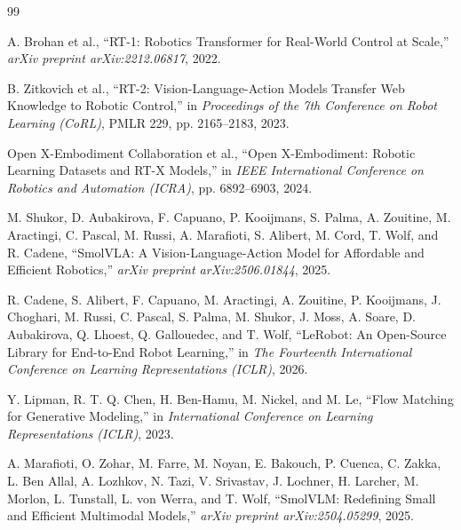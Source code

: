 \documentclass[12pt,a4paper]{report}
\begin{document}
\clearpage
\begin{thebibliography}{99}

A. Brohan et al.,
\newblock ``RT-1: Robotics Transformer for Real-World Control at Scale,''
\newblock \emph{arXiv preprint arXiv:2212.06817}, 2022.

B. Zitkovich et al.,
\newblock ``RT-2: Vision-Language-Action Models Transfer Web Knowledge to Robotic Control,''
\newblock in \emph{Proceedings of the 7th Conference on Robot Learning (CoRL)},
PMLR 229, pp. 2165--2183, 2023.

Open X-Embodiment Collaboration et al.,
\newblock ``Open X-Embodiment: Robotic Learning Datasets and RT-X Models,''
\newblock in \emph{IEEE International Conference on Robotics and Automation (ICRA)}, pp. 6892--6903, 2024.

M. Shukor, D. Aubakirova, F. Capuano, P. Kooijmans, S. Palma, A. Zouitine,
M. Aractingi, C. Pascal, M. Russi, A. Marafioti, S. Alibert, M. Cord,
T. Wolf, and R. Cadene,
\newblock ``SmolVLA: A Vision-Language-Action Model for Affordable and Efficient Robotics,''
\newblock \emph{arXiv preprint arXiv:2506.01844}, 2025.

R. Cadene, S. Alibert, F. Capuano, M. Aractingi, A. Zouitine, P. Kooijmans,
J. Choghari, M. Russi, C. Pascal, S. Palma, M. Shukor, J. Moss, A. Soare,
D. Aubakirova, Q. Lhoest, Q. Gallouedec, and T. Wolf,
\newblock ``LeRobot: An Open-Source Library for End-to-End Robot Learning,''
\newblock in \emph{The Fourteenth International Conference on Learning Representations (ICLR)}, 2026.

Y. Lipman, R. T. Q. Chen, H. Ben-Hamu, M. Nickel, and M. Le,
\newblock ``Flow Matching for Generative Modeling,''
\newblock in \emph{International Conference on Learning Representations (ICLR)}, 2023.

A. Marafioti, O. Zohar, M. Farre, M. Noyan, E. Bakouch, P. Cuenca,
C. Zakka, L. Ben Allal, A. Lozhkov, N. Tazi, V. Srivastav, J. Lochner,
H. Larcher, M. Morlon, L. Tunstall, L. von Werra, and T. Wolf,
\newblock ``SmolVLM: Redefining Small and Efficient Multimodal Models,''
\newblock \emph{arXiv preprint arXiv:2504.05299}, 2025.


\end{thebibliography}
\end{document}
